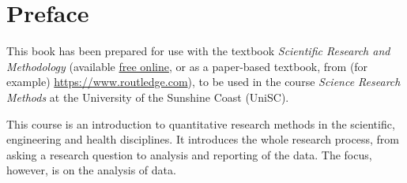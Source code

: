 \documentclass[
  11pt,
  a4paper,
  krantz2]{krantz}
\begin{document}
\let\origexercise=\exercise
\def\exercise{\begingroup\setitemize{labelindent=1.5em,labelsep=3mm,leftmargin=*}\setenumerate{labelindent=1.5em,labelsep=3mm,leftmargin=*}\origexercise}  
\let\origendexercise=\endexercise
\def\endexercise{\origendexercise\endgroup}

{
\setcounter{tocdepth}{1}
\tableofcontents
}
\chapter*{Preface}\label{preface}


\newcommand{\cms}{\,\text{cm}}
\newcommand{\dLs}{\,\text{dL}}
\newcommand{\xdLs}{\text{dL}}

\newcommand{\fmols}{\,\text{fmol}}
\newcommand{\gs}{\,\text{g}}
\newcommand{\hs}{\,\text{h}}
\newcommand{\xhs}{\text{h}}

\newcommand{\has}{\,\text{ha}}
\newcommand{\xhas}{\text{ha}}

\newcommand{\kgs}{\,\text{kg}}
\newcommand{\kms}{\,\text{km}}
\newcommand{\kWhs}{\,\text{kWh}}
\newcommand{\lbs}{\,\text{lb}}
\newcommand{\Ls}{\,\text{L}}
\newcommand{\xLs}{\text{L}}

\newcommand{\mgs}{\,\text{mg}}
\newcommand{\mls}{\,\text{mL}}
\newcommand{\microgs}{\,\ensuremath{\mu}\text{g}}
\newcommand{\millis}{\,\text{ms}}
\newcommand{\mins}{\,\text{mins}}
\newcommand{\mJs}{\,\text{mJ}}
\newcommand{\MPas}{\,\text{MPa}}
\newcommand{\mmols}{\,\text{mmol}}
\newcommand{\mLs}{\,\text{mL}}
\newcommand{\mms}{\,\text{mm}}
\newcommand{\ms}{\,\text{m}}
\newcommand{\xms}{\text{m}}
\newcommand{\ozs}{\,\text{oz}}
\newcommand{\secs}{\,\text{s}}
\newcommand{\xsecs}{\text{s}}
\newcommand{\ppms}{\,\text{ppm}}
\newcommand{\ys}{\,\text{y}}
\newcommand{\vs}{\,\text{V}}

This book has been prepared for use with the textbook \emph{Scientific Research and Methodology} (available \href{https://peterkdunn.github.io/SRM-Textbook}{free online}, or as a
paper-based textbook, from (for example) \url{https://www.routledge.com}),
to be used in the course \emph{Science Research Methods} at the
University of the Sunshine Coast (UniSC).

This course is an introduction to quantitative research methods in the scientific, engineering and health disciplines.
It introduces the whole research process,
from asking a research question to analysis and reporting of the data.
The focus, however, is on the analysis of data.
\end{document}
